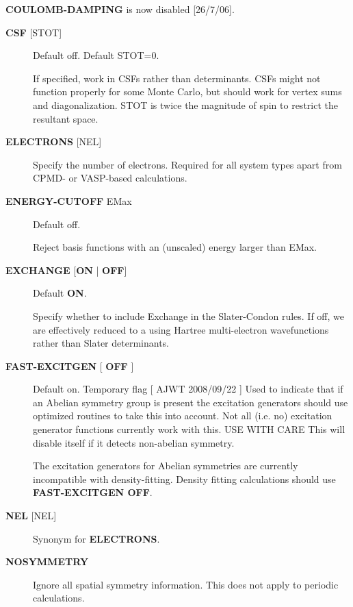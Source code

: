 \documentclass[openany,a4paper,10pt]{manual}
\begin{document}
\begin{notice}[note]
\textbf{COULOMB-DAMPING} is now disabled {[}26/7/06{]}.
\end{notice}
\begin{description}
\item[\textbf{CSF} {[}STOT{]}]
Default off.  Default STOT=0.

If specified, work in CSFs rather than determinants.  CSFs might not
function properly for some Monte Carlo, but should work for vertex
sums and diagonalization.   STOT is twice the magnitude of spin to
restrict the resultant space.

\item[\textbf{ELECTRONS} {[}NEL{]}]
Specify the number of electrons.  Required for all system types
apart from CPMD- or VASP-based  calculations.

\item[\textbf{ENERGY-CUTOFF} EMax]
Default off.

Reject basis functions with an (unscaled) energy larger than EMax.

\item[\textbf{EXCHANGE} {[}\textbf{ON} | \textbf{OFF}{]}]
Default \textbf{ON}.

Specify whether to include Exchange in the Slater-Condon rules.
If off, we are effectively reduced to a using Hartree multi-electron
wavefunctions rather than Slater determinants.

\item[\textbf{FAST-EXCITGEN}  {[} \textbf{OFF} {]}]
Default on.  Temporary flag {[} AJWT 2008/09/22 {]}
Used to indicate that if an Abelian symmetry group is present
the excitation generators should use optimized routines
to take this into account.  Not all (i.e. no) excitation generator functions
currently work with this.  USE WITH CARE
This will disable itself if it detects non-abelian symmetry.

\begin{notice}[warning]
The excitation generators for Abelian symmetries are currently incompatible
with density-fitting.  Density fitting calculations should use \textbf{FAST-EXCITGEN OFF}.
\end{notice}

\item[\textbf{NEL} {[}NEL{]}]
Synonym for \textbf{ELECTRONS}.

\item[\textbf{NOSYMMETRY}]
Ignore all spatial symmetry information. This does not apply to
periodic calculations.


\end{description}
\end{document}
